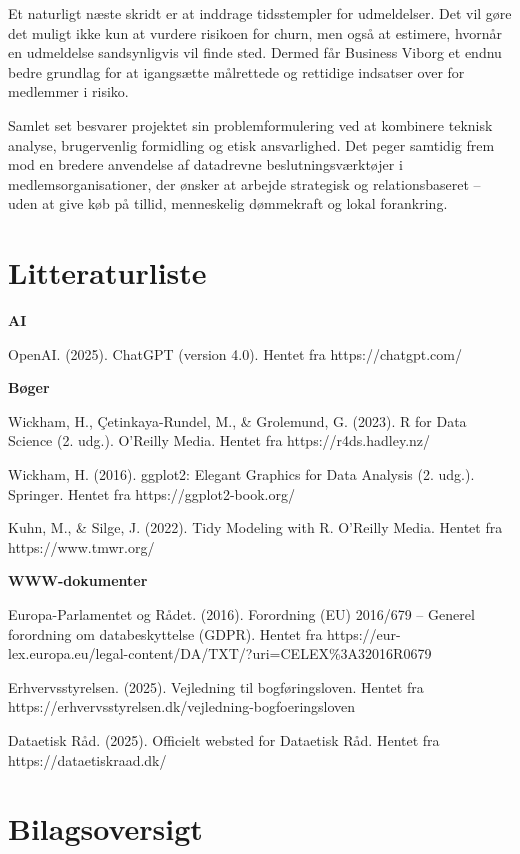 \documentclass[
  11pt,
  letterpaper,
  DIV=11,
  numbers=noendperiod]{scrartcl}
\begin{document}
Et naturligt næste skridt er at inddrage tidsstempler for udmeldelser.
Det vil gøre det muligt ikke kun at vurdere risikoen for churn, men også
at estimere, hvornår en udmeldelse sandsynligvis vil finde sted. Dermed
får Business Viborg et endnu bedre grundlag for at igangsætte målrettede
og rettidige indsatser over for medlemmer i risiko.

Samlet set besvarer projektet sin problemformulering ved at kombinere
teknisk analyse, brugervenlig formidling og etisk ansvarlighed. Det
peger samtidig frem mod en bredere anvendelse af datadrevne
beslutningsværktøjer i medlemsorganisationer, der ønsker at arbejde
strategisk og relationsbaseret -- uden at give køb på tillid,
menneskelig dømmekraft og lokal forankring.

\newpage

\section{Litteraturliste}\label{litteraturliste}

\textbf{AI}

OpenAI. (2025). ChatGPT (version 4.0). Hentet fra https://chatgpt.com/

\textbf{Bøger}

Wickham, H., Çetinkaya-Rundel, M., \& Grolemund, G. (2023). R for Data
Science (2. udg.). O'Reilly Media. Hentet fra https://r4ds.hadley.nz/

Wickham, H. (2016). ggplot2: Elegant Graphics for Data Analysis (2.
udg.). Springer. Hentet fra https://ggplot2-book.org/

Kuhn, M., \& Silge, J. (2022). Tidy Modeling with R. O'Reilly Media.
Hentet fra https://www.tmwr.org/

\textbf{WWW-dokumenter}

Europa-Parlamentet og Rådet. (2016). Forordning (EU) 2016/679 -- Generel
forordning om databeskyttelse (GDPR). Hentet fra
https://eur-lex.europa.eu/legal-content/DA/TXT/?uri=CELEX\%3A32016R0679

Erhvervsstyrelsen. (2025). Vejledning til bogføringsloven. Hentet fra
https://erhvervsstyrelsen.dk/vejledning-bogfoeringsloven

Dataetisk Råd. (2025). Officielt websted for Dataetisk Råd. Hentet fra
https://dataetiskraad.dk/

\newpage

\section{Bilagsoversigt}\label{bilagsoversigt}
\end{document}

